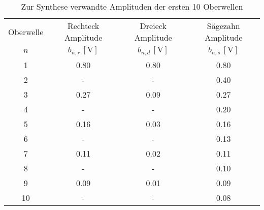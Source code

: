 \begin{table}[!h]
	\centering
	\begin{tabular}{|c|c|c|c|}
		\hline
		Oberwelle & Rechteck Amplitude & Dreieck Amplitude & Sägezahn Amplitude\\
		$n$ & $b_{n,r}\,[\si{\volt}]$ & $b_{n,d}\,[\si{\volt}]$ & $b_{n,s}\,[\si{\volt}]$\\\hline\hline
		\num{1} & \num{0.80}  & \num{0.80}  & \num{0.80} \\
		\num{2} & -  & -  & \num{0.40} \\
		\num{3} & \num{0.27}  & \num{0.09}  & \num{0.27} \\
		\num{4} & -  & -  & \num{0.20} \\
		\num{5} & \num{0.16}  & \num{0.03}  & \num{0.16} \\
		\num{6} & -  & -  & \num{0.13} \\
		\num{7} & \num{0.11}  & \num{0.02}  & \num{0.11} \\
		\num{8} & -  & -  & \num{0.10} \\
		\num{9} & \num{0.09}  & \num{0.01}  & \num{0.09} \\
		\num{10} & -  & -  & \num{0.08} \\
		\hline
	\end{tabular}
	\caption{Zur Synthese verwandte Amplituden der ersten 10 Oberwellen \label{tab:Synthese}}
\end{table}